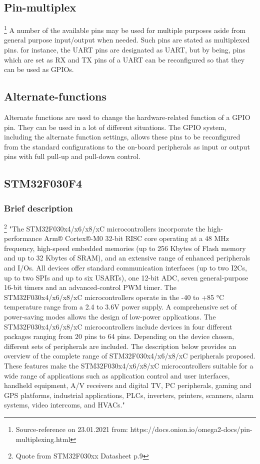 \documentclass[11pt]{scrartcl}
\begin{document}
\newpage
	\subsection{Pin-multiplex}
\footnote{\label{foot:9}Source-reference on 23.01.2021 from: https://docs.onion.io/omega2-docs/pin-multiplexing.html}
A number of the available pins may be used for multiple purposes aside from general purpose input/output when needed. Such pins are stated as multiplexed pins. for instance, the UART pins are designated as UART, but by being, pins which are set as RX and TX pins of a UART can be reconfigured so that they can be used as GPIOs.
	\subsection{Alternate-functions}
Alternate functions are used to change the hardware-related function of a GPIO pin. They can be used in a lot of different situations. The GPIO system, including the alternate function settings, allows these pins to be reconfigured from the
standard configurations to the on-board peripherals as input or output pins with full pull-up and pull-down control.



	\newpage
	\subsection{STM32F030F4}
	\subsubsection{Brief description}
\footnote{\label{foot:10}Quote from STM32F030xx Datasheet p.9}
"The STM32F030x4/x6/x8/xC microcontrollers incorporate the high-performance Arm® Cortex®-M0 32-bit RISC core operating at a 48 MHz frequency, high-speed embedded memories (up to 256 Kbytes of Flash memory and up to 32 Kbytes of SRAM), and an extensive range of enhanced peripherals and I/Os. All devices offer standard communication interfaces (up to two I2Cs, up to two SPIs and up to six USARTs), one 12-bit ADC, seven general-purpose 16-bit timers and an advanced-control PWM timer. The STM32F030x4/x6/x8/xC microcontrollers operate in the -40 to +85 °C temperature range from a 2.4 to 3.6V power supply. A comprehensive set of power-saving modes allows the design of low-power applications. The STM32F030x4/x6/x8/xC microcontrollers include devices in four different packages ranging from 20 pins to 64 pins. Depending on the device chosen, different sets of peripherals are included. The description below provides an overview of the complete range of STM32F030x4/x6/x8/xC peripherals proposed. These features make the STM32F030x4/x6/x8/xC microcontrollers suitable for a wide range of applications such as application control and user interfaces, handheld equipment, A/V receivers and digital TV, PC peripherals, gaming and GPS platforms, industrial applications, PLCs, inverters, printers, scanners, alarm systems, video intercoms, and HVACs."
\newpage
\end{document}
